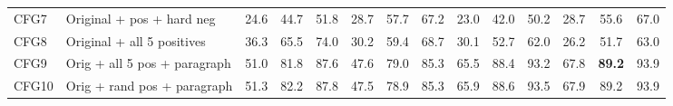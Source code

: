 \documentclass{article}
\begin{document}
\begin{table}[t]
\begin{adjustbox}{max width=\textwidth}
\begin{tabular}{llcccccccccccc}
CFG7 & Original + pos + hard neg & 24.6 & 44.7 & 51.8 & 28.7 & 57.7 & 67.2 & 23.0 & 42.0 & 50.2 & 28.7 & 55.6 & 67.0 \\
CFG8 & Original + all 5 positives & 36.3 & 65.5 & 74.0 & 30.2 & 59.4 & 68.7 & 30.1 & 52.7 & 62.0 & 26.2 & 51.7 & 63.0 \\
CFG9 & Orig + all 5 pos + paragraph & 51.0 & 81.8 & 87.6 & 47.6 & 79.0 & 85.3 & 65.5 & 88.4 & 93.2 & 67.8 & \textbf{89.2} & 93.9 \\
CFG10 & Orig + rand pos + paragraph & 51.3 & 82.2 & 87.8 & 47.5 & 78.9 & 85.3 & 65.9 & 88.6 & 93.5 & 67.9 & 89.2 & 93.9 \\
\bottomrule
\end{tabular}
\end{adjustbox}
\end{table}
\end{document}

